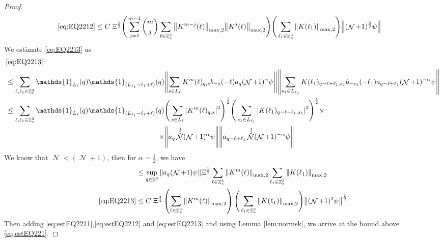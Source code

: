 \documentclass[sn-mathphys, Numbered ,a4paper]{sn-jnl}%
\DeclareMathOperator{\Z}{\mathbb{Z}}
\DeclareMathOperator{\NN}{\mathcal{N}}
\newcommand{\half}{\frac{1}{2}}
\theoremstyle{plain}
\theoremstyle{definition}
\theoremstyle{remark}
\theoremstyle{plain}
\theoremstyle{definition}
\theoremstyle{remark}
\begin{document}
{\begin{proof}
\begin{alignat}{2}
 	\eqref{eq:EQ2212}&\leq C\; \Xi^\half \Bigg(\sum\limits_{j=1}^{m-1} {{m}\choose j} \sum\limits_{\ell \in \Z^3_*} \norm{K^{m-j}(\ell)}_{ \mathrm{max,2} } \norm{K^{j}(\ell)}_{\mathrm{max,2}}\Bigg) \Bigg(\sum\limits_{ \ell_1\in \Z^3_*}\norm{  K(\ell_1)}_{\mathrm{max,2}}\Bigg)  \norm{(\NN+1)^\frac{3}{2} \psi} \label{eq:estEQ2212}
 \end{alignat}
 We estimate \eqref{eq:EQ2213} as
\begin{alignat}{2}
	&\eqref{eq:EQ2213}\nonumber\\
	&\leq\sum\limits_{\ell, \ell_1\in \Z^3_*}  \mathds{1}_{L_{\ell}}(q) \mathds{1}_{(L_{\ell_1}-\ell_1+\ell)}(q) \norm{ \sum\limits_{s\in L_{\ell}} K^m(\ell)_{q,s} b_{-s}(-\ell) a_{q}(\NN+1)^{\alpha}\psi}\norm{ \sum\limits_{s_1 \in L_{\ell_1}} K(\ell_1)_{q-\ell+\ell_1,s_1} b_{-s_1}(-\ell_1)a_{q-\ell+\ell_1} (\NN+1)^{-\alpha} \psi }\nonumber\\
	&\leq\sum\limits_{\ell, \ell_1\in \Z^3_*} \mathds{1}_{L_{\ell}}(q) \begin{aligned}[t] \mathds{1}_{(L_{\ell_1}-\ell_1+\ell)}(q) &\Bigg(\sum\limits_{s \in L_{\ell}} \abs{K^m(\ell)_{q,s}}^2\Bigg)^\half \Bigg(\sum\limits_{s_1 \in L_{\ell_1}} \abs{K(\ell_1)_{q-\ell+\ell_1,s_1}}^2\Bigg)^\half \times\nonumber\\ \times&\norm{ a_{q} \NN^\half (\NN+1)^{\alpha}\psi} \norm{ a_{q-\ell+\ell_1} \NN^\half (\NN+1)^{-\alpha} \psi }\end{aligned}\\
\end{alignat}
We know that $\NN<(\NN+1)$, then for $\alpha = \half$, we have
\begin{align}
	&\leq \sup_{q \in \Z^3}\norm{ a_{q} (\NN+1)\psi} \Xi^\half\sum\limits_{\ell \in \Z^3_*} \norm{  K^{m}(\ell)}_{\mathrm{max,2}}  \sum\limits_{\ell_1 \in \Z^3_*} \norm{K(\ell_1)}_{\mathrm{max,2}} \nonumber\\
	\eqref{eq:EQ2213}&\leq C\;\Xi^{\frac{3}{4}} \left(\sum\limits_{\ell \in \Z^3_*} \norm{K^m(\ell)}_{\mathrm{max,2}}\right) \Bigg(\sum\limits_{\ell_1 \in \Z^3_*} \norm{K(\ell_1)}_{\mathrm{max,2}} \Bigg)  \norm{ (\NN+1)^2\psi}^\half \label{eq:estEQ2213}
\end{align}
 Then adding \eqref{eq:estEQ2211},\eqref{eq:estEQ2212} and \eqref{eq:estEQ2213} and using Lemma \ref{lem:normsk}, we arrive at the bound above \eqref{eq:estEQ221}. 
\end{proof}}
\end{document}
